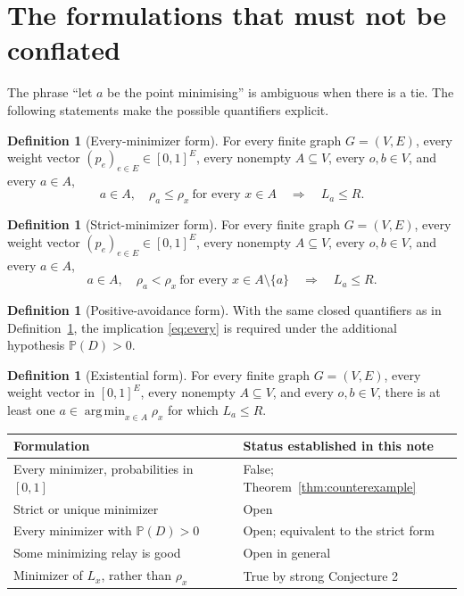 \documentclass[11pt]{article}
\theoremstyle{definition}
\newtheorem{definition}[theorem]{Definition}
\newcommand{\PP}{\mathbb P}
\newcommand{\1}{\mathbf 1}
\newcommand{\argmin}{\operatorname*{arg\,min}}
\begin{document}
\section{The formulations that must not be conflated}

The phrase ``let \(a\) be the point minimising'' is ambiguous when there
is a tie.  The following statements make the possible quantifiers explicit.

\begin{definition}[Every-minimizer form]\label{def:every}
For every finite graph \(G=(V,E)\), every weight vector
\((p_e)_{e\in E}\in[0,1]^E\), every nonempty \(A\subseteq V\), every
\(o,b\in V\), and every \(a\in A\),
\begin{equation}\label{eq:every}
 a\in A,\quad \rho_a\le \rho_x\ \text{for every }x\in A
 \quad\Longrightarrow\quad L_a\le R.
\end{equation}
\end{definition}

\begin{definition}[Strict-minimizer form]\label{def:strict}
For every finite graph \(G=(V,E)\), every weight vector
\((p_e)_{e\in E}\in[0,1]^E\), every nonempty \(A\subseteq V\), every
\(o,b\in V\), and every \(a\in A\),
\begin{equation}\label{eq:strict}
 a\in A,\quad \rho_a<\rho_x\ \text{for every }x\in A\setminus\{a\}
 \quad\Longrightarrow\quad L_a\le R.
\end{equation}
\end{definition}

\begin{definition}[Positive-avoidance form]\label{def:positive}
With the same closed quantifiers as in Definition~\ref{def:every}, the
implication \eqref{eq:every} is required under the additional hypothesis
\(\PP(D)>0\).
\end{definition}

\begin{definition}[Existential form]\label{def:exists}
For every finite graph \(G=(V,E)\), every weight vector in \([0,1]^E\),
every nonempty \(A\subseteq V\), and every \(o,b\in V\), there is at least
one \(a\in\argmin_{x\in A}\rho_x\) for which \(L_a\le R\).
\end{definition}

\begin{center}
\begin{tabular}{@{}ll@{}}
\toprule
Formulation & Status established in this note \\
\midrule
Every minimizer, probabilities in \([0,1]\) & False; Theorem~\ref{thm:counterexample} \\
Strict or unique minimizer & Open \\
Every minimizer with \(\PP(D)>0\) & Open; equivalent to the strict form \\
Some minimizing relay is good & Open in general \\
Minimizer of \(L_x\), rather than \(\rho_x\) & True by strong Conjecture 2 \\
\bottomrule
\end{tabular}
\end{center}
\end{document}
